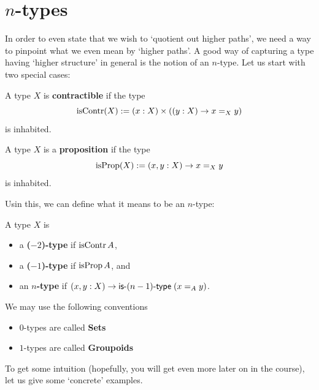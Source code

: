 \documentclass[10pt,oneside,leqno,openright]{memoir}
\begin{document}
\section*{$n$-types}
In order to even state that we wish to `quotient out higher paths', we need a way to pinpoint what we even mean by `higher paths'. A good way of capturing a type having `higher structure' in general is the notion of an $n$-type.  Let us start with two special cases:
%
\begin{definition}
    A type $X$ is \textbf{contractible} if the type
    \[ \operatorname{isContr}(X) := (x : X) \times ((y : X) \to x =_X y) \]
    is inhabited.
\end{definition}
%
\begin{definition}
    A type $X$ is a \textbf{proposition} if the type
    \[ \operatorname{isProp}(X) := (x, y : X) \to x =_X y\]
    is inhabited.
\end{definition}
%
Usin this, we can define what it means to be an $n$-type:
\begin{definition}
    A type $X$ is
    \begin{itemize}
        \item a \textbf{($-2$)-type} if $\operatorname{isContr}{A}$,
        \item a \textbf{($-1$)-type} if $\operatorname{isProp}{A}$, and
        \item an \textbf{$n$-type} if $(x, y : X) \to \textsf{is-{$(n-1)$}-type}\;(x=_Ay)$.
    \end{itemize}
\end{definition}
We may use the following conventions
\begin{convention}\phantom{.}
  \begin{itemize}
  \item $0$-types are called \textbf{Sets}
  \item $1$-types are called \textbf{Groupoids}
  \end{itemize}
\end{convention}
To get some intuition (hopefully, you will get even more later on in the course), let us give some `concrete' examples.
\end{document}
